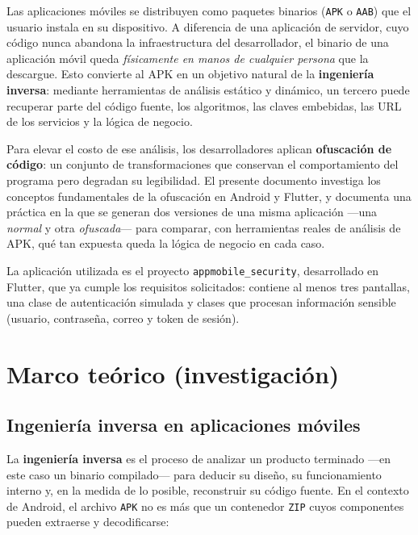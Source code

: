 \documentclass[12pt,letterpaper]{article}
\begin{document}
Las aplicaciones móviles se distribuyen como paquetes binarios (\texttt{APK} o
\texttt{AAB}) que el usuario instala en su dispositivo. A diferencia de una
aplicación de servidor, cuyo código nunca abandona la infraestructura del
desarrollador, el binario de una aplicación móvil queda \emph{físicamente en
manos de cualquier persona} que la descargue. Esto convierte al APK en un
objetivo natural de la \textbf{ingeniería inversa}: mediante herramientas de
análisis estático y dinámico, un tercero puede recuperar parte del código
fuente, los algoritmos, las claves embebidas, las URL de los servicios y la
lógica de negocio.

Para elevar el costo de ese análisis, los desarrolladores aplican
\textbf{ofuscación de código}: un conjunto de transformaciones que conservan el
comportamiento del programa pero degradan su legibilidad. El presente documento
investiga los conceptos fundamentales de la ofuscación en Android y Flutter, y
documenta una práctica en la que se generan dos versiones de una misma
aplicación —una \emph{normal} y otra \emph{ofuscada}— para comparar, con
herramientas reales de análisis de APK, qué tan expuesta queda la lógica de
negocio en cada caso.

La aplicación utilizada es el proyecto \texttt{appmobile\_security}, desarrollado
en Flutter, que ya cumple los requisitos solicitados: contiene al menos tres
pantallas, una clase de autenticación simulada y clases que procesan información
sensible (usuario, contraseña, correo y token de sesión).

\section{Marco teórico (investigación)}

\subsection{Ingeniería inversa en aplicaciones móviles}

La \textbf{ingeniería inversa} es el proceso de analizar un producto terminado
—en este caso un binario compilado— para deducir su diseño, su funcionamiento
interno y, en la medida de lo posible, reconstruir su código fuente. En el
contexto de Android, el archivo \texttt{APK} no es más que un contenedor
\texttt{ZIP} cuyos componentes pueden extraerse y decodificarse:
\end{document}
